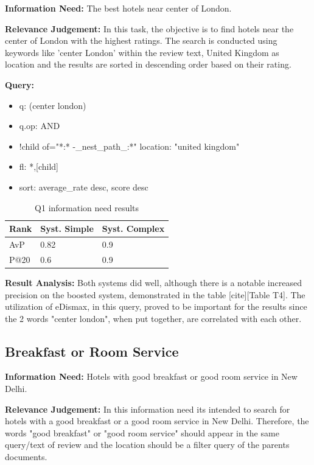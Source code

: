 \documentclass[sigconf]{acmart}
\begin{document}
\textbf{Information Need:} The best hotels near center of London.

\textbf{Relevance Judgement:} In this task, the objective is to find hotels near the center of London with the highest ratings. The search is conducted using keywords like 'center London' within the review text, United Kingdom as location and the results are sorted in descending order based on their rating.

\textbf{Query:}

\begin{itemize}
    \item q: (center london)
    \item q.op: AND
    \item {!child of="*:* -\_nest\_path\_:*"} location: "united kingdom"
    \item fl: *,[child]
    \item sort: average\_rate desc, score desc
\end{itemize}

\begin{table}[h]
\caption{Q1 information need results}
\label{tab:q1}
\begin{tabular}{lll}
\toprule
Rank & Syst. Simple & Syst. Complex\\
\midrule
AvP & 0.82 & 0.9  \\
P@20 & 0.6 & 0.9 \\
\bottomrule
\end{tabular}
\end{table}


\textbf{Result Analysis:} Both systems did well, although there is a notable increased precision on the boosted system, demonstrated in the table [cite][Table T4]. The utilization of eDismax, in this query, proved to be important for the results since the 2 words "center london", when put together, are correlated with each other.

\subsection{Breakfast or Room Service}


\textbf{Information Need:} Hotels with good breakfast or good room service in New Delhi.

\textbf{Relevance Judgement:} In this information need its intended to search for hotels with a good breakfast or a good room service in New Delhi. Therefore, the words "good breakfast" or "good room service" should appear in the same query/text of review and the location should be a filter query of the parents documents.
\end{document}
